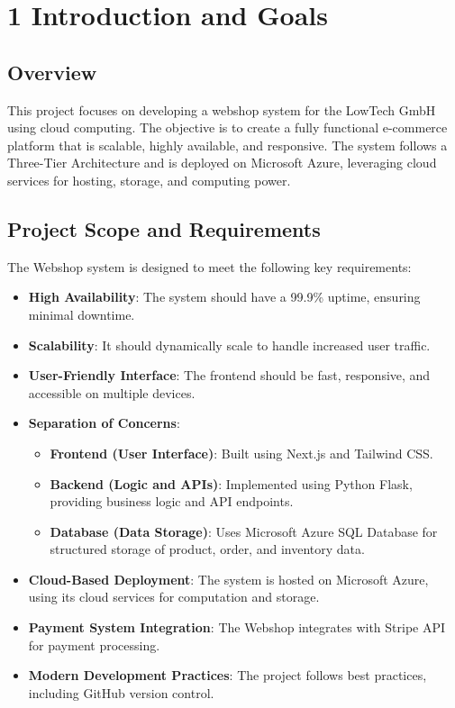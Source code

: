 \hypertarget{introduction-and-goals}{%
\section{1 Introduction and Goals}\label{section-introduction-and-goals}}

\subsection{Overview}
This project focuses on developing a webshop system for the LowTech GmbH using cloud computing. The objective is to create a fully functional e-commerce platform that is scalable, highly available, and responsive. The system follows a Three-Tier Architecture and is deployed on Microsoft Azure, leveraging cloud services for hosting, storage, and computing power.

\subsection{Project Scope and Requirements}
The Webshop system is designed to meet the following key requirements:

\begin{itemize}
    \item \textbf{High Availability}: The system should have a 99.9\% uptime, ensuring minimal downtime.
    \item \textbf{Scalability}: It should dynamically scale to handle increased user traffic.
    \item \textbf{User-Friendly Interface}: The frontend should be fast, responsive, and accessible on multiple devices.
    \item \textbf{Separation of Concerns}:
    \begin{itemize}
        \item \textbf{Frontend (User Interface)}: Built using Next.js and Tailwind CSS.
        \item \textbf{Backend (Logic and APIs)}: Implemented using Python Flask, providing business logic and API endpoints.
        \item \textbf{Database (Data Storage)}: Uses Microsoft Azure SQL Database for structured storage of product, order, and inventory data.
    \end{itemize}
    \item \textbf{Cloud-Based Deployment}: The system is hosted on Microsoft Azure, using its cloud services for computation and storage.
    \item \textbf{Payment System Integration}: The Webshop integrates with Stripe API for payment processing.
    \item \textbf{Modern Development Practices}: The project follows best practices, including GitHub version control.
\end{itemize}

